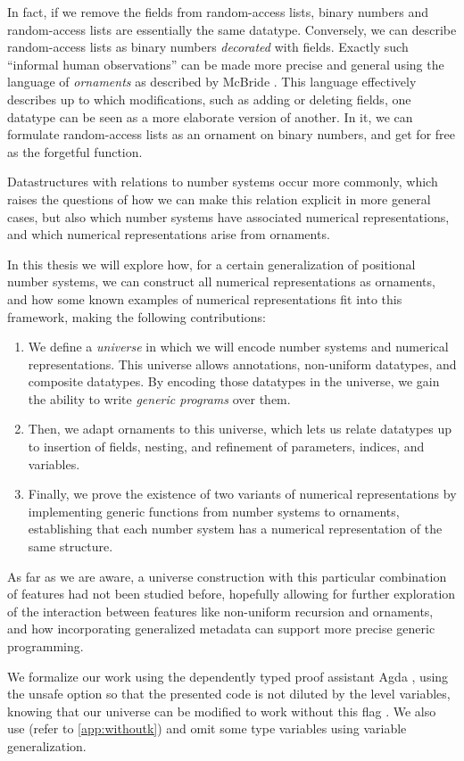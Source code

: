 In fact, if we remove the fields from random-access lists, binary numbers and random-access lists are essentially the same datatype. Conversely, we can describe random-access lists as binary numbers \emph{decorated} with fields. Exactly such ``informal human observations'' can be made more precise and general using the language of \emph{ornaments} as described by McBride \cite{algorn}. This language effectively describes up to which modifications, such as adding or deleting fields, one datatype can be seen as a more elaborate version of another. In it, we can formulate random-access lists as an ornament on binary numbers, and get  for free as the forgetful function.

Datastructures with relations to number systems occur more commonly, which raises the questions of how we can make this relation explicit in more general cases, but also which number systems have associated numerical representations, and which numerical representations arise from ornaments.

In this thesis we will explore how, for a certain generalization of positional number systems, we can construct all numerical representations as ornaments, and how some known examples of numerical representations fit into this framework, making the following contributions:
\begin{enumerate}
    \item We define a \emph{universe} in which we will encode number systems and numerical representations. This universe allows annotations, non-uniform datatypes, and composite datatypes. By encoding those datatypes in the universe, we gain the ability to write \emph{generic programs} over them.
    \item Then, we adapt ornaments to this universe, which lets us relate datatypes up to insertion of fields, nesting, and refinement of parameters, indices, and variables.
    \item Finally, we prove the existence of two variants of numerical representations by implementing generic functions from number systems to ornaments, establishing that each number system has a numerical representation of the same structure.
\end{enumerate}
As far as we are aware, a universe construction with this particular combination of features had not been studied before, hopefully allowing for further exploration of the interaction between features like non-uniform recursion and ornaments, and how incorporating generalized metadata can support more precise generic programming. 

We formalize our work using the dependently typed proof assistant Agda \cite{agda}, using the unsafe  option so that the presented code is not diluted by the level variables, knowing that our universe can be modified to work without this flag \cite{practgen}. We also use  (refer to \autoref{app:withoutk}) and omit some type variables using variable generalization.